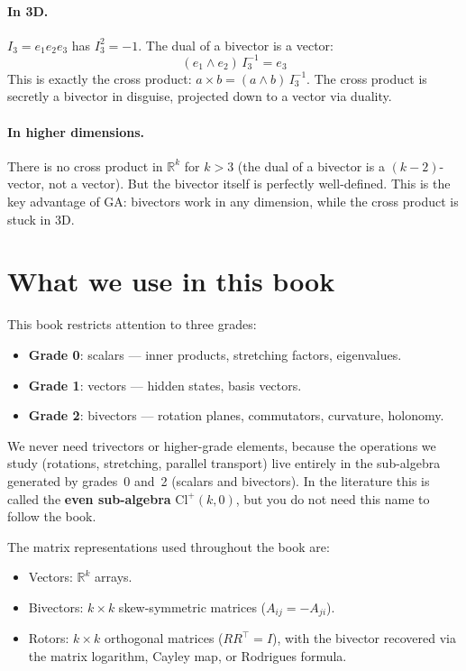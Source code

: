 \documentclass[11pt, twoside, openright]{memoir}
\newcommand{\op}{\wedge}          %
\begin{document}
\paragraph{In 3D.}
$I_3 = e_1 e_2 e_3$ has $I_3^2 = -1$.  The dual of a bivector is a
vector:
\[
  (e_1 \op e_2)\, I_3^{-1} = e_3
\]
This is exactly the cross product: $a \times b = (a \op b)\, I_3^{-1}$.
The cross product is secretly a bivector in disguise, projected down
to a vector via duality.

\paragraph{In higher dimensions.}
There is no cross product in $\mathbb{R}^k$ for $k > 3$ (the dual of a
bivector is a $(k-2)$-vector, not a vector).  But the bivector itself
is perfectly well-defined.  This is the key advantage of GA: bivectors
work in any dimension, while the cross product is stuck in 3D.

\section{What we use in this book}

This book restricts attention to three grades:
\begin{itemize}[nosep]
\item \textbf{Grade 0}: scalars --- inner products, stretching factors,
  eigenvalues.
\item \textbf{Grade 1}: vectors --- hidden states, basis vectors.
\item \textbf{Grade 2}: bivectors --- rotation planes, commutators,
  curvature, holonomy.
\end{itemize}

We never need trivectors or higher-grade elements, because the
operations we study (rotations, stretching, parallel transport) live entirely in the sub-algebra generated by grades~0 and~2 (scalars and bivectors). In the literature this is called the \textbf{even sub-algebra} $\mathrm{Cl}^+(k,0)$, but you do not need this name to follow the book.

The matrix representations used throughout the book are:
\begin{itemize}[nosep]
\item Vectors: $\mathbb{R}^k$ arrays.
\item Bivectors: $k \times k$ skew-symmetric matrices
  ($A_{ij} = -A_{ji}$).
\item Rotors: $k \times k$ orthogonal matrices ($R R^\top = I$),
  with the bivector recovered via the matrix logarithm, Cayley map,
  or Rodrigues formula.
\end{itemize}
\end{document}
